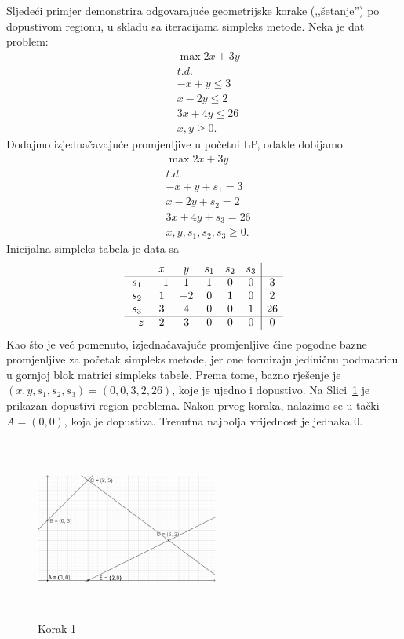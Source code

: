 \documentclass[a4paper, utf8, 11pt, colorlinks]{book}
\theoremstyle{definition}
\begin{document}
Sljedeći primjer demonstrira odgovarajuće geometrijske korake (,,šetanje'') po dopustivom regionu, u skladu sa iteracijama simpleks metode.   %
 Neka je dat problem:
 \begin{align*}
 	&\max 2x + 3y \\
 	&  {t.d.} \\
 	& -x + y \leq 3 \\
 	& x - 2y \leq 2 \\
 	& 3x + 4y \leq 26 \\
 	& x, y \geq 0.
 \end{align*}
 Dodajmo izjednačavajuće promjenljive u početni LP, odakle dobijamo 
  \begin{align*}
 	&\max 2x + 3y \\
 	& t.d. \\
 	& -x + y + s_1 = 3 \\
 	& x - 2y + s_2 = 2 \\
 	& 3x + 4y + s_3 =  26 \\
 	& x, y, s_1, s_2, s_3 \geq 0.
 \end{align*}
 Inicijalna simpleks 
tabela je data sa
$$\begin{array}{cccccc| c}
	& x & y & s_1 & s_2 & s_3 & \\ \hline
	s_1  & -1 & 1 & 1 & 0 & 0 & 3 \\
	s_2  & 1 & -2 & 0 & 1 & 0 & 2 \\
	s_3  & 3 & 4 & 0 & 0 & 1 & 26 \\ \hline
	-z  & 2 & 3 & 0 & 0 & 0 & 0 \\
\end{array}
$$ 
Kao što je već pomenuto, izjednačavajuće promjenljive čine pogodne bazne promjenljive za početak simpleks metode, jer one formiraju jediničnu podmatricu u gornjoj blok matrici 
simpleks tabele. Prema tome, bazno rješenje je
$(x, y, s_1, s_2, s_3) = (0, 0, 3, 2, 26)$, koje je ujedno i dopustivo.
Na Slici~\ref{fig:step-1} je prikazan dopustivi region problema. Nakon prvog koraka, nalazimo se u tački $A=(0,0)$, koja je dopustiva. Trenutna najbolja vrijednost je jednaka 0. 
\begin{figure}[H]
	\centering
	\includegraphics[width=170pt, height=170pt]{simpleks-primjer-2-sl1.eps}
	\caption{Korak 1}
	\label{fig:step-1}
\end{figure}
\end{document}

